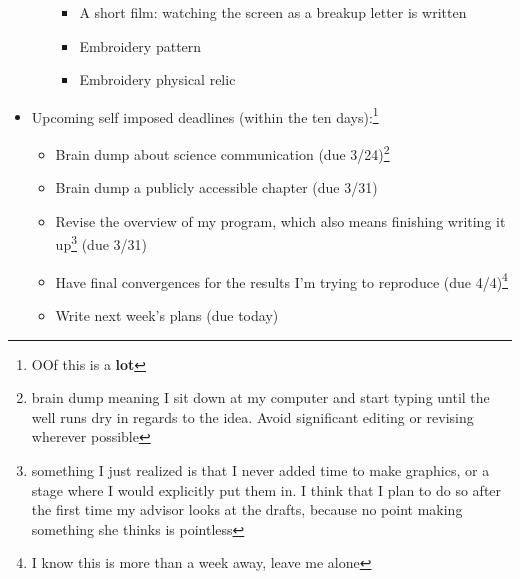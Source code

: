 \documentclass[12pt]{article}[titlepage]
\newcommand{\1}{\={a}}
\newcommand{\2}{\={e}}
\newcommand{\3}{\={\i}}
\newcommand{\4}{\=o}
\newcommand{\5}{\=u}
\newcommand{\6}{\={A}}
\renewcommand{\,}{\textsuperscript{,}}
\begin{document}
\begin{itemize}
\begin{itemize}
\begin{itemize}  
\item A short film: watching the screen as a breakup letter is written  
\item Embroidery pattern  
\item Embroidery physical relic  
\end{itemize}  
\end{itemize}   
\item Upcoming self imposed deadlines (within the ten days):\footnote{OOf this is a \textbf{lot}}  
\begin{itemize}  
\item Brain dump about science communication (due 3/24)\footnote{brain dump meaning I sit down at my computer and start typing until the well runs dry in regards to the idea. Avoid significant editing or revising wherever possible}  
\item Brain dump a publicly accessible chapter (due 3/31)  
\item Revise the overview of my program, which also means finishing writing it up\footnote{something I just realized is that I never added time to make graphics, or a stage where I would explicitly put them in. I think that I plan to do so after the first time my advisor looks at the drafts, because no point making something she thinks is pointless} (due 3/31)  
\item Have final convergences for the results I'm trying to reproduce (due 4/4)\footnote{I know this is more than a week away, leave me alone}  
\item Write next week's plans (due today)  
\end{itemize}  
\end{itemize}
\end{document}
